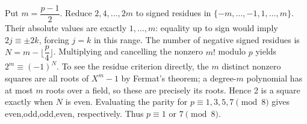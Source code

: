 Put $m=\dfrac{p-1}{2}$. Reduce $2,4,\ldots,2m$ to signed residues in $\{-m,\ldots,-1,1,\ldots,m\}$. Their absolute values are exactly $1,\ldots,m$: equality up to sign would imply $2j\equiv\pm2k$, forcing $j=k$ in this range. The number of negative signed residues is $N=m-\lfloor \dfrac{p}{4}\rfloor$. Multiplying and cancelling the nonzero $m!$ modulo $p$ yields $2^m\equiv(-1)^N$. To see the residue criterion directly, the $m$ distinct nonzero squares are all roots of $X^m-1$ by Fermat's theorem; a degree-$m$ polynomial has at most $m$ roots over a field, so these are precisely its roots. Hence 2 is a square exactly when $N$ is even. Evaluating the parity for $p\equiv1,3,5,7\pmod8$ gives even,odd,odd,even, respectively. Thus $\boxed{p\equiv1\text{ or }7\pmod8}$.
